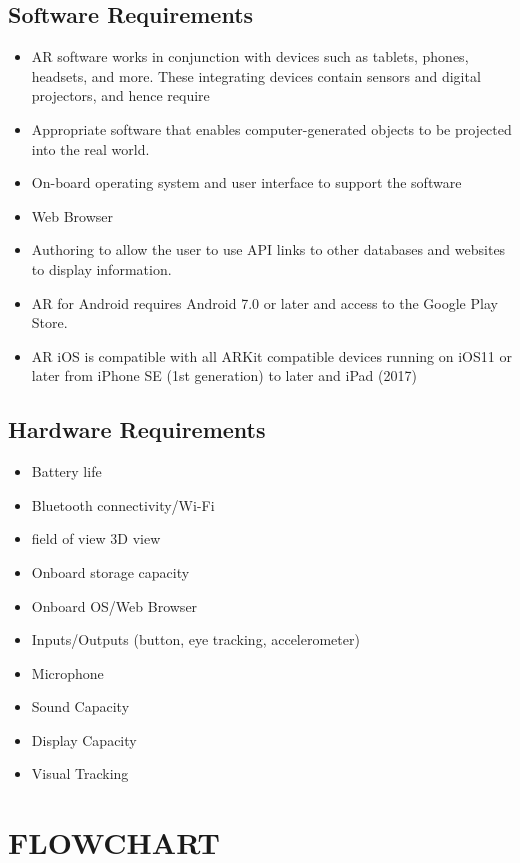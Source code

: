 \documentclass[12pt]{article}
\begin{document}
\subsection{Software Requirements}
\begin{itemize}
    \item AR software works in conjunction with devices such as tablets, phones, headsets, and more. These integrating devices contain sensors and digital projectors, and hence require
    \item Appropriate software that enables computer-generated objects to be projected into the real world.
    \item On-board operating system and user interface to support the software
    \item Web Browser
    \item Authoring to allow the user to use API links to other databases and websites to display information.
    \item AR for Android requires Android 7.0 or later and access to the Google Play Store.
    \item AR iOS is compatible with all ARKit compatible devices running on iOS11 or later from iPhone SE (1st generation) to later and iPad (2017)
\end{itemize}

\subsection{Hardware Requirements}
\begin{itemize}
	\item Battery life
	\item Bluetooth connectivity/Wi-Fi
	\item field of view 3D view
	\item Onboard storage capacity
	\item Onboard OS/Web Browser
	\item Inputs/Outputs (button, eye tracking, accelerometer)
	\item Microphone
	\item Sound Capacity
	\item Display Capacity
	\item Visual Tracking
\end{itemize}

\section{\uppercase{\large{Flowchart}}}
\end{document}
